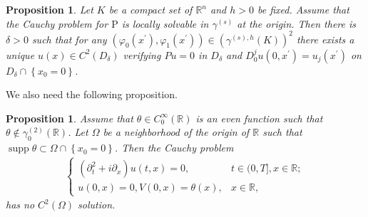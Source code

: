 \documentclass{article}
\def\R{\mathbb{R}}
\newtheorem{proposition}[theorem]{Proposition}
\begin{document}
\begin{proposition}
	\label{pro1}
	Let \(K\) be a compact set of \(\R^{n}\) and \(h>0\) be
	fixed. Assume that the Cauchy problem for \(\mathrm{P}\) is locally solvable
	in \(\gamma^{(s)}\) at the origin. Then there is \(\delta>0\) such
	that for any \(\left(\varphi_0\left(x^{\prime}\right),
	\varphi_1\left(x^{\prime}\right)\right) \in\left(\gamma^{(s),
		h}(K)\right)^{2}\) there exists a unique \(u(x) \in
	C^{2}\left(D_{\delta}\right)\)  verifying \(Pu=0\) in \(D_{\delta}\) and \(D_{0}^{j} u\left(0, x^{\prime}\right)=u_{j}\left(x^{\prime}\right)\) on \(D_{\delta} \cap\left\{x_{0}=0\right\}\).
\end{proposition}

We also need the following proposition.

\begin{proposition}\label{pro2}
	Assume that \(\theta \in C_{0}^{\infty}(\R)\) is an even
	function such that \(\theta \notin \gamma_{0}^{(2)}(\R)\). Let \(\Omega\) be a neighborhood of the origin of \(\R\)
	such that \(\operatorname{supp} \theta \subset \Omega
	\cap\left\{x_{0}=0\right\}\).
	Then the Cauchy problem
	\begin{align}
		\label{eq:MODN}
		\begin{cases}
			(\partial_{t}^{2} +
			i\partial_{x})u(t,x)=0,& t\in(0,T],x\in\mathbb{R};\\
			u(0,x)=0, V(0,x) = \theta(x),&  x\in\mathbb{R},
		\end{cases}
	\end{align}
	has no \(C^{2}(\Omega)\) solution.
\end{proposition}
\end{document}
